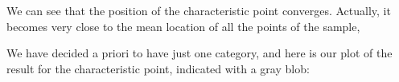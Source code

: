 \documentclass[a4paper,12pt,polish]{jupyterBook}
\begin{document}
\sphinxAtStartPar
We can see that the position of the characteristic point converges. Actually, it becomes very close to the mean location of all the points of the sample,
\begin{sphinxVerbatimInput}

\begin{sphinxVerbatim}[commandchars=\\\{\}]
\PYG{p}{[}\PYG{p}{[}\PYG{p}{]}\PYG{p}{[}\PYG{p}{]}\PYG{p}{]}
\end{sphinxVerbatim}
\end{sphinxVerbatimInput}
\begin{sphinxVerbatimOutput}

\begin{sphinxVerbatim}[commandchars=\\\{\}]
[0.62 0.48]
\end{sphinxVerbatim}
\end{sphinxVerbatimOutput}

\sphinxAtStartPar
We have decided a priori to have just one category, and here is our plot of the result for the characteristic point, indicated with a gray blob:
\begin{sphinxVerbatimOutput}

\noindent{}
\end{sphinxVerbatimOutput}
\end{document}

